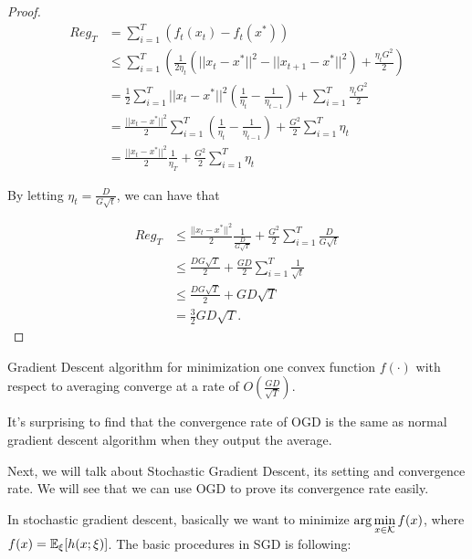 \documentclass[../main.tex]{subfiles}
\begin{document}
\begin{proof}
	\begin{equation*}
		\begin{aligned}
			Reg_T & = \sum\limits_{i=1}^T (f_t(x_t) - f_t(x^*))\\
					& \leq \sum\limits_{i=1}^T ( \frac{1}{2\eta_t} ( || x_t - x^*||^2 -  ||x_{t+1} - x^*||^2 ) + \frac{\eta_t G^2}{2}) \\
					& = \frac{1}{2} \sum\limits_{i=1}^T || x_t - x^*||^2 (\frac{1}{\eta_t} -\frac{1}{\eta_{t-1}})  +  \sum\limits_{i=1}^T  \frac{\eta_t G^2}{2} \\
					& =  \frac{|| x_t - x^*||^2}{2} \sum\limits_{i=1}^T  (\frac{1}{\eta_t} -\frac{1}{\eta_{t-1}})  + \frac{ G^2}{2}  \sum\limits_{i=1}^T  \eta_t \\
					& = \frac{|| x_t - x^*||^2}{2} \frac{1}{\eta_T}  + \frac{ G^2}{2}  \sum\limits_{i=1}^T  \eta_t
		\end{aligned}
	\end{equation*}
	
	By letting $\eta_t = \frac{D}{G\sqrt{t}}$, we can have that
	
	\begin{equation*}
		\begin{aligned}
				Reg_T & \leq  \frac{|| x_t - x^*||^2}{2} \frac{1}{ \frac{D}{G\sqrt{T}}}  + \frac{ G^2}{2}  \sum\limits_{i=1}^T  \frac{D}{G\sqrt{t}} \\
				& \leq \frac{D G\sqrt{T}}{2}   + \frac{ GD}{2}  \sum\limits_{i=1}^T  \frac{1}{\sqrt{t}}\\
				& \leq \frac{D G\sqrt{T}}{2}   + GD  \sqrt{T} \\
				& = \frac{3}{2}  GD  \sqrt{T}.
		\end{aligned} 
	\end{equation*}
\end{proof}

\begin{corollary}
	Gradient Descent algorithm for minimization one convex function $f(\cdot)$ with respect to averaging converge at a rate of $O(\frac{GD}{\sqrt{T}})$.
\end{corollary}

It's surprising to find that the convergence rate of OGD is the same as normal gradient descent algorithm when they output the average.

Next, we will talk about Stochastic Gradient Descent, its setting and convergence rate. We will see that we can use OGD to prove its convergence rate easily.

In stochastic gradient descent, basically we want to minimize $\arg\min\limits_{x\in \mathcal{K}} f(x)$, where $f(x) = \mathbb{E}_{\xi}[h(x;\xi)]$. The basic procedures in SGD is following:
\end{document}
